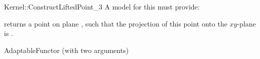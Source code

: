 \begin{ccRefFunctionObjectConcept}{Kernel::ConstructLiftedPoint_3}
A model for this must provide:


       {returns a point  on plane , such that the projection of
        this point onto the $xy$-plane is .}

\ccRefines
AdaptableFunctor (with two arguments)

\ccSeeAlso
{} \\

\end{ccRefFunctionObjectConcept}
